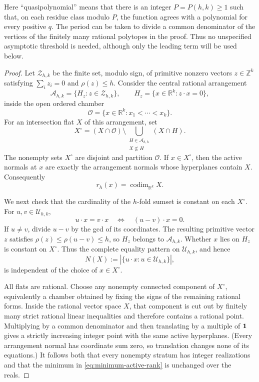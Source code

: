 \documentclass[11pt,reqno]{amsart}
\theoremstyle{definition}
\theoremstyle{remark}
\begin{document}
Here ``quasipolynomial'' means that there is an integer $P=P(h,k)\geq1$
such that, on each residue class modulo $P$, the function agrees with a
polynomial for every positive $q$.  The period can be taken to divide a
common denominator of the vertices of the finitely many rational polytopes
in the proof.  Thus no unspecified asymptotic threshold is needed, although
only the leading term will be used below.

\begin{proof}
Let $\mathcal Z_{h,k}$ be the finite set, modulo sign, of primitive nonzero
vectors $z\in\mathbb Z^k$ satisfying $\sum_i z_i=0$ and $\rho(z)\leq h$.
Consider the central rational arrangement
\[
 \mathcal A_{h,k}=\{H_z:z\in\mathcal Z_{h,k}\},
 \qquad H_z=\{x\in\mathbb R^k:z\cdot x=0\},
\]
inside the open ordered chamber
\[
 \mathcal O=\{x\in\mathbb R^k:x_1<\cdots<x_k\}.
\]
For an intersection flat $X$ of this arrangement, set
\[
 X^\circ=(X\cap\mathcal O)\setminus
 \bigcup_{\substack{H\in\mathcal A_{h,k}\\X\not\subseteq H}}(X\cap H).
\]
The nonempty sets $X^\circ$ are disjoint and partition $\mathcal O$.
If $x\in X^\circ$, then the active normals at $x$ are exactly the
arrangement normals whose hyperplanes contain $X$.  Consequently
\begin{equation}\label{eq:flat-rank}
 r_h(x)=\operatorname{codim}_{\mathbb R^k}X.
\end{equation}

We next check that the cardinality of the $h$-fold sumset is constant on
each $X^\circ$.  For $u,v\in\mathcal U_{h,k}$,
\[
 u\cdot x=v\cdot x\quad\Longleftrightarrow\quad (u-v)\cdot x=0.
\]
If $u\ne v$, divide $u-v$ by the gcd of its coordinates.  The resulting
primitive vector $z$ satisfies
$\rho(z)\leq\rho(u-v)\leq h$, so $H_z$ belongs to
$\mathcal A_{h,k}$.  Whether $x$ lies on $H_z$ is constant on $X^\circ$.
Thus the complete equality pattern on $\mathcal U_{h,k}$, and hence
\[
 N(X):=\left|\{u\cdot x:u\in\mathcal U_{h,k}\}\right|,
\]
is independent of the choice of $x\in X^\circ$.

All flats are rational.  Choose any nonempty connected component of
$X^\circ$, equivalently a chamber obtained by fixing the signs of the
remaining rational forms.  Inside the rational vector space $X$, that
component is cut out by finitely many strict rational linear inequalities
and therefore contains a rational point.  Multiplying by a common denominator
and then translating by a multiple of ${\bf1}$ gives a strictly increasing
integer point with the same active hyperplanes.  (Every arrangement normal
has coordinate sum zero, so translation changes none of its equations.)
It follows both that every nonempty stratum has integer realizations and
that the minimum in \eqref{eq:minimum-active-rank} is unchanged over the
reals.


\end{proof}
\end{document}
